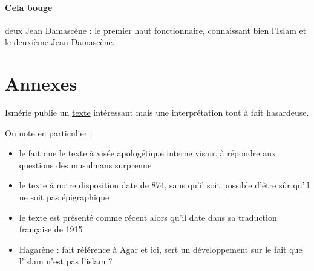 \paragraph{Cela bouge} deux Jean Damascène : le premier haut fonctionnaire, connaissant bien l'Islam et le deuxième Jean Damascène. 


\section{Annexes}

Ismérie publie un \href{https://archive.org/details/uncolloquedupatr0000fnau/page/20/mode/2up}{texte} intéressant mais une interprétation tout à fait hasardeuse.
\begin{Synthesis}
On note en particulier : 
\begin{itemize}
    \item le fait que le texte à visée apologétique interne visant à répondre aux questions des musulmans surprenne
    \item le texte à notre disposition date de 874, sans qu'il soit possible d'être sûr qu'il ne soit pas épigraphique
    \item le texte est présenté comme récent alors qu'il date dans sa traduction française de 1915
    \item Hagarène : fait référence à Agar et ici, sert un développement sur le fait que l'islam n'est pas l'islam ? 
\end{itemize}
\end{Synthesis}

